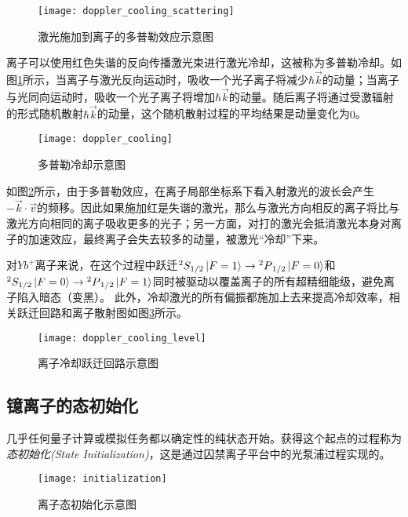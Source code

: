 \begin{figure}
    \centering
    \caption[激光施加到离子的多普勒效应示意图]{激光施加到离子的多普勒效应示意图\label{fig:doppler_cooling_scattering}}
    \texttt{[image: doppler\_cooling\_scattering]}
\end{figure}
离子可以使用红色失谐的反向传播激光束进行激光冷却，这被称为多普勒冷却\cite[]{Hänsch_Schawlow_1975}。如图\ref{fig:doppler_cooling_scattering}所示，当离子与激光反向运动时，吸收一个光子离子将减少$\hbar \vec{k}$的动量；当离子与光同向运动时，吸收一个光子离子将增加$\hbar \vec{k}$的动量。随后离子将通过受激辐射的形式随机散射$\hbar \vec{k}$的动量，这个随机散射过程的平均结果是动量变化为$0$。

\begin{figure}
    \centering
    \caption[多普勒冷却示意图]{多普勒冷却示意图\label{fig:doppler_cooling}}
    \texttt{[image: doppler\_cooling]}
\end{figure}
如图\ref{fig:doppler_cooling}所示，由于多普勒效应，在离子局部坐标系下看入射激光的波长会产生$-\vec{k}\cdot\vec{v}$的频移。因此如果施加红是失谐的激光，那么与激光方向相反的离子将比与激光方向相同的离子吸收更多的光子；另一方面，对打的激光会抵消激光本身对离子的加速效应，最终离子会失去较多的动量，被激光“冷却”下来。

对$Yb^+$离子来说，在这个过程中跃迁$^2S_{1/2}\ket{F=1}\to {^2P}_{1/2}\ket{F=0}$和$^2S_{1/2}\ket{F=0}\to {^2P}_{1/2}\ket{F=1}$同时被驱动以覆盖离子的所有超精细能级，避免离子陷入暗态（变黑）。
此外，冷却激光的所有偏振都施加上去来提高冷却效率，相关跃迁回路和离子散射图如图\ref{fig:doppler_cooling_level}所示。
\begin{figure}
    \centering
    \caption[离子冷却跃迁回路示意图]{离子冷却跃迁回路示意图\label{fig:doppler_cooling_level}}
    \texttt{[image: doppler\_cooling\_level]}
\end{figure}

\subsection[镱离子的态初始化]{镱离子的态初始化\label{section:yb_state_init}}

几乎任何量子计算或模拟任务都以确定性的纯状态开始。获得这个起点的过程称为\emph{态初始化(State Initialization)}，这是通过囚禁离子平台中的光泵浦过程实现的。

\begin{figure}
    \centering
    \caption[离子态初始化示意图]{离子态初始化示意图\label{fig:initialization}}
    \texttt{[image: initialization]}
\end{figure}

